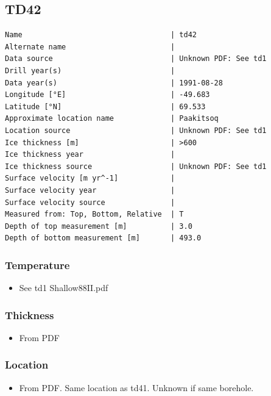 \documentclass[article,a4paper,times,11pt,twoside]{article}
\begin{document}
\subsection{TD42}
\label{sec:org56855d7}
\begin{verbatim}
Name                                  | td42
Alternate name                        | 
Data source                           | Unknown PDF: See td1
Drill year(s)                         | 
Data year(s)                          | 1991-08-28
Longitude [°E]                        | -49.683
Latitude [°N]                         | 69.533
Approximate location name             | Paakitsoq
Location source                       | Unknown PDF: See td1
Ice thickness [m]                     | >600
Ice thickness year                    | 
Ice thickness source                  | Unknown PDF: See td1
Surface velocity [m yr^-1]            | 
Surface velocity year                 | 
Surface velocity source               | 
Measured from: Top, Bottom, Relative  | T
Depth of top measurement [m]          | 3.0
Depth of bottom measurement [m]       | 493.0
\end{verbatim}

\subsubsection{Temperature}
\label{sec:org11f7681}

\begin{itemize}
\item See td1 Shallow88II.pdf
\end{itemize}

\subsubsection{Thickness}
\label{sec:org824ac54}

\begin{itemize}
\item From PDF
\end{itemize}

\subsubsection{Location}
\label{sec:org854f276}

\begin{itemize}
\item From PDF. Same location as td41. Unknown if same borehole.
\end{itemize}
\end{document}
